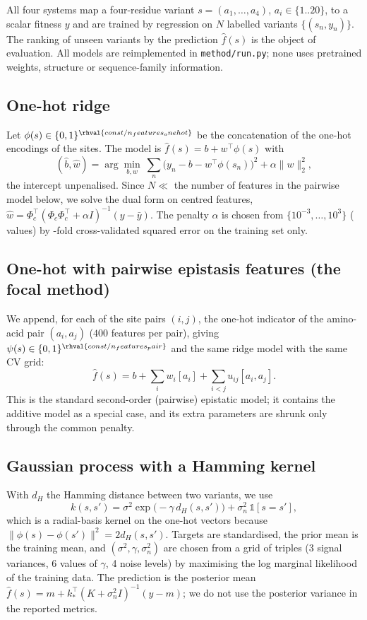 All four systems map a four-residue variant $s=(a_1,\dots,a_4)$, $a_i\in\{1..20\}$, to a scalar fitness $y$ and are trained by regression on $N$ labelled variants $\{(s_n,y_n)\}$. The ranking of unseen variants by the prediction $\hat f(s)$ is the object of evaluation. All models are reimplemented in \texttt{method/run.py}; none uses pretrained weights, structure or sequence-family information.

\subsection{One-hot ridge}
Let $\phi(s)\in\{0,1\}^{\rhval{const/n_features_onehot}}$ be the concatenation of the one-hot encodings of the  sites. The model is $\hat f(s)=b+w^\top\phi(s)$ with
\begin{equation}
(\hat b,\hat w)=\arg\min_{b,w}\ \sum_{n}\big(y_n-b-w^\top\phi(s_n)\big)^2+\alpha\|w\|_2^2 ,
\end{equation}
the intercept unpenalised. Since $N\ll$ the number of features in the pairwise model below, we solve the dual form on centred features, $\hat w=\Phi_c^\top(\Phi_c\Phi_c^\top+\alpha I)^{-1}(y-\bar y)$. The penalty $\alpha$ is chosen from $\{10^{-3},\dots,10^{3}\}$ ( values) by -fold cross-validated squared error on the training set only.

\subsection{One-hot with pairwise epistasis features (the focal method)}
We append, for each of the  site pairs $(i,j)$, the one-hot indicator of the amino-acid pair $(a_i,a_j)$ ($400$ features per pair), giving $\psi(s)\in\{0,1\}^{\rhval{const/n_features_pair}}$ and the same ridge model with the same CV grid:
\begin{equation}
\hat f(s)=b+\sum_i w_i[a_i]+\sum_{i<j}u_{ij}[a_i,a_j].
\end{equation}
This is the standard second-order (pairwise) epistatic model; it contains the additive model as a special case, and its extra parameters are shrunk only through the common penalty.

\subsection{Gaussian process with a Hamming kernel}
With $d_H$ the Hamming distance between two variants, we use
\begin{equation}
k(s,s')=\sigma^2\exp\!\big(-\gamma\, d_H(s,s')\big)+\sigma_n^2\,\mathbb 1[s=s'] ,
\end{equation}
which is a radial-basis kernel on the one-hot vectors because $\|\phi(s)-\phi(s')\|^2=2d_H(s,s')$. Targets are standardised, the prior mean is the training mean, and $(\sigma^2,\gamma,\sigma_n^2)$ are chosen from a grid of  triples (3 signal variances, 6 values of $\gamma$, 4 noise levels) by maximising the log marginal likelihood of the training data. The prediction is the posterior mean $\hat f(s)=m+k_*^\top(K+\sigma_n^2I)^{-1}(y-m)$; we do not use the posterior variance in the reported metrics.

